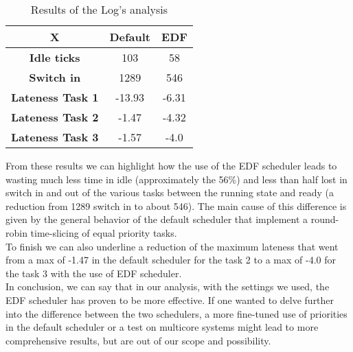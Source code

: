 \documentclass{article}
\begin{document}
\begin{table}[H]
    \centering
    \begin{tabular}{c|cc}
        \textbf{X} & \textbf{Default} & \textbf{EDF} \\
         \hline
        \textbf{Idle ticks} & 103 & 58 \\
        \textbf{Switch in} & 1289 & 546 \\
        \textbf{Lateness Task 1} & -13.93 & -6.31 \\
        \textbf{Lateness Task 2} & -1.47 & -4.32 \\
        \textbf{Lateness Task 3} & -1.57 & -4.0 \\
    \end{tabular}
    \caption{Results of the Log's analysis}
    \label{tab:logs_results}
\end{table}

From these results we can highlight how the use of the EDF scheduler leads to wasting much less time in idle (approximately the 56\%) and less than half lost in switch in and out of the various tasks between the running state and ready (a reduction from 1289 switch in to about 546). The main cause of this difference is given by the general behavior of the default scheduler that implement a round-robin time-slicing of equal priority tasks. \\ To finish we can also underline a reduction of the maximum lateness that went from a max of -1.47 in the default scheduler for the task 2 to a max of -4.0 for the task 3 with the use of EDF scheduler. \\

In conclusion, we can say that in our analysis, with the settings we used, the EDF scheduler has proven to be more effective. If one wanted to delve further into the difference between the two schedulers, a more fine-tuned use of priorities in the default scheduler or a test on multicore systems might lead to more comprehensive results, but are out of our scope and possibility.
\end{document}
